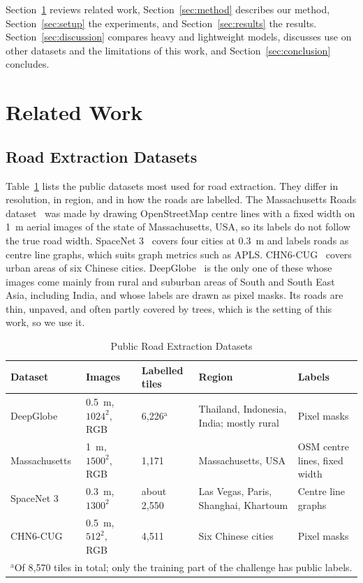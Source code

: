 \documentclass{ieeeaccess}
\begin{document}
Section~\ref{sec:related} reviews related work, Section~\ref{sec:method} describes our method, Section~\ref{sec:setup} the experiments, and Section~\ref{sec:results} the results. Section~\ref{sec:discussion} compares heavy and lightweight models, discusses use on other datasets and the limitations of this work, and Section~\ref{sec:conclusion} concludes.

\section{Related Work}
\label{sec:related}

\subsection{Road Extraction Datasets}

Table~\ref{tab:datasets} lists the public datasets most used for road extraction. They differ in resolution, in region, and in how the roads are labelled. The Massachusetts Roads dataset~\cite{mnih2013thesis} was made by drawing OpenStreetMap centre lines with a fixed width on 1~m aerial images of the state of Massachusetts, USA, so its labels do not follow the true road width. SpaceNet 3~\cite{vanetten2018spacenet} covers four cities at 0.3~m and labels roads as centre line graphs, which suits graph metrics such as APLS. CHN6-CUG~\cite{zhu2021chn6} covers urban areas of six Chinese cities. DeepGlobe~\cite{demir2018deepglobe} is the only one of these whose images come mainly from rural and suburban areas of South and South East Asia, including India, and whose labels are drawn as pixel masks. Its roads are thin, unpaved, and often partly covered by trees, which is the setting of this work, so we use it.

\begin{table}[t]
\caption{Public Road Extraction Datasets}
\label{tab:datasets}
\setlength{\tabcolsep}{2pt}
\tablebodyfont
\begin{tabular}{|p{42pt}|p{40pt}|p{30pt}|p{60pt}|p{46pt}|}
\hline
Dataset & Images & Labelled tiles & Region & Labels \\
\hline
DeepGlobe~\cite{demir2018deepglobe} & 0.5~m, $1024^2$, RGB & 6,226$^{\mathrm{a}}$ & Thailand, Indonesia, India; mostly rural & Pixel masks \\
Massachusetts~\cite{mnih2013thesis} & 1~m, $1500^2$, RGB & 1,171 & Massachusetts, USA & OSM centre lines, fixed width \\
SpaceNet 3~\cite{vanetten2018spacenet} & 0.3~m, $1300^2$ & about 2,550 & Las Vegas, Paris, Shanghai, Khartoum & Centre line graphs \\
CHN6-CUG~\cite{zhu2021chn6} & 0.5~m, $512^2$, RGB & 4,511 & Six Chinese cities & Pixel masks \\
\hline
\multicolumn{5}{p{230pt}}{$^{\mathrm{a}}$Of 8,570 tiles in total; only the training part of the challenge has public labels.}
\end{tabular}
\end{table}
\end{document}
